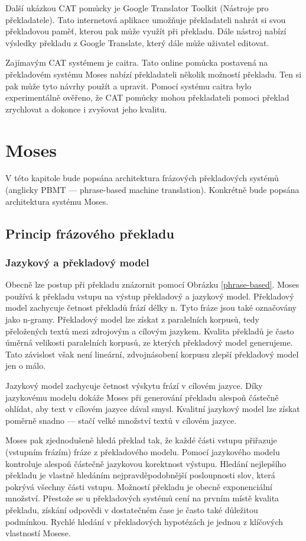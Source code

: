 \documentclass[12pt,a4paper]{report}
\begin{document}
Další ukázkou CAT pomůcky je Google Translator Toolkit (Nástroje pro překladatele). Tato internetová aplikace umožňuje překladateli nahrát si svou překladovou paměť, kterou pak může využít při překladu. Dále nástroj nabízí výsledky překladu z Google Translate, který dále může uživatel editovat.

Zajímavým CAT systémem je caitra. Tato online pomůcka postavená na překladovém systému Moses nabízí překladateli několik možností překladu. Ten si pak může tyto návrhy použít a upravit. Pomocí systému caitra bylo experimentálně ověřeno, že CAT pomůcky mohou překladateli pomoci překlad zrychlovat a dokonce i zvyšovat jeho kvalitu.

\chapter{Moses}

V této kapitole bude popsána architektura frázových překladových systémů (anglicky PBMT --- phrase-based machine translation). Konkrétně bude popsána architektura systému Moses.

\section{Princip frázového překladu}

\subsection{Jazykový a překladový model}
Obecně lze postup při překladu znázornit pomocí Obrázku \ref{phrase-based}. Moses používá k překladu vstupu na výstup překladový a jazykový model. Překladový model zachycuje četnost překladů frází délky n. Tyto fráze jsou také označovány jako n-gramy. Překladový model lze získat z paralelních korpusů, tedy přeložených textů mezi zdrojovým a cílovým jazykem. Kvalita překladů je často úměrná velikosti paralelních korpusů, ze kterých překladový model generujeme. Tato závislost však není lineární, zdvojnásobení korpusu zlepší překladový model jen o málo.

Jazykový model zachycuje četnost výskytu frází v cílovém jazyce. Díky jazykovému modelu dokáže Moses při generování překladu alespoň částečně ohlídat, aby text v cílovém jazyce dával smysl. Kvalitní jazykový model lze získat poměrně snadno --- stačí velké množství textů v cílovém jazyce.

Moses pak zjednodušeně hledá překlad tak, že každé části vstupu přiřazuje (vstupním frázím) fráze z překladového modelu. Pomocí jazykového modelu kontroluje alespoň částečně jazykovou korektnost výstupu. Hledání nejlepšího překladu je vlastně hledáním nejpravděpodobnější posloupnosti slov, která pokrývá všechny části vstupu. Možností překladu je obecně exponenciální množství. Přestože se u překladových systémů cení na prvním místě kvalita překladu, získání odpovědi v dostatečném čase je často také důležitou podmínkou. Rychlé hledání v překladových hypotézách je jednou z klíčových vlastností Mosese.
\end{document}
